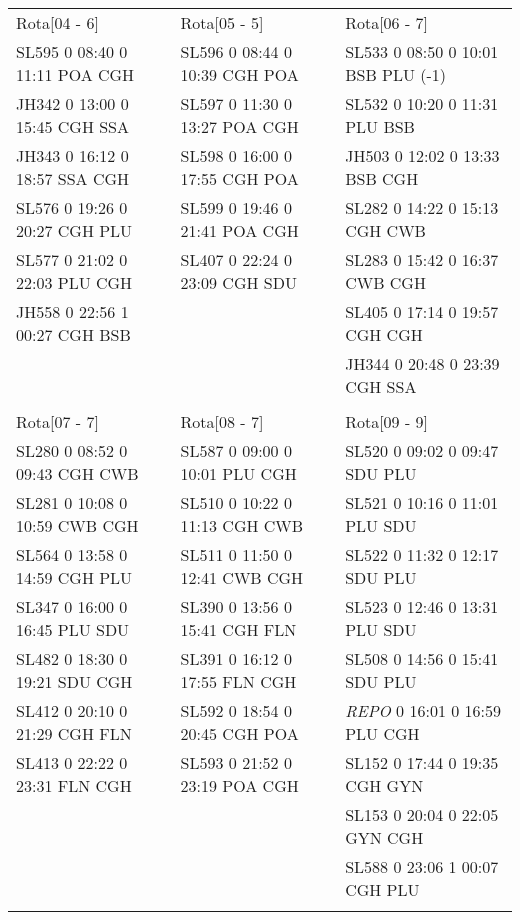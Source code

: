 \begin{scriptsize}
\begin{longtable}{l l l}
Rota[04 - 6]  & Rota[05 - 5]  & Rota[06 - 7] \\
SL595  0 08:40 0 11:11 POA CGH & SL596  0 08:44 0 10:39 CGH POA & SL533  0 08:50
0 10:01 BSB PLU (-1)\\
JH342  0 13:00 0 15:45 CGH SSA & SL597  0 11:30 0 13:27
POA CGH & SL532  0 10:20 0 11:31 PLU BSB\\ JH343  0 16:12 0 18:57 SSA CGH & SL598  0 16:00 0 17:55 CGH POA & JH503  0 12:02 0 13:33 BSB CGH\\
SL576  0 19:26 0 20:27 CGH PLU & SL599  0 19:46 0 21:41 POA CGH & SL282  0 14:22 0 15:13 CGH CWB\\
SL577  0 21:02 0 22:03 PLU CGH & SL407  0 22:24 0 23:09 CGH SDU & SL283  0 15:42 0 16:37 CWB CGH\\
JH558  0 22:56 1 00:27 CGH BSB & & SL405  0 17:14 0 19:57 CGH CGH\\
 &  & JH344  0 20:48 0 23:39 CGH SSA\\
 
\\

Rota[07 - 7]  & Rota[08 - 7]  & Rota[09 - 9] \\
SL280  0 08:52 0 09:43 CGH CWB & SL587  0 09:00 0 10:01 PLU CGH & SL520  0 09:02 0 09:47 SDU PLU\\
SL281  0 10:08 0 10:59 CWB CGH & SL510  0 10:22 0 11:13 CGH CWB & SL521  0 10:16 0 11:01 PLU SDU\\
SL564  0 13:58 0 14:59 CGH PLU & SL511  0 11:50 0 12:41 CWB CGH & SL522  0 11:32 0 12:17 SDU PLU\\
SL347  0 16:00 0 16:45 PLU SDU & SL390  0 13:56 0 15:41 CGH FLN & SL523  0 12:46 0 13:31 PLU SDU\\
SL482  0 18:30 0 19:21 SDU CGH & SL391  0 16:12 0 17:55 FLN CGH & SL508  0 14:56 0 15:41 SDU PLU\\
SL412  0 20:10 0 21:29 CGH FLN & SL592  0 18:54 0 20:45 CGH POA & \textit{REPO}  
0 16:01 0 16:59 PLU CGH\\ 
SL413  0 22:22 0 23:31 FLN CGH & SL593  0 21:52 0 23:19 POA CGH & SL152  0 17:44 0 19:35 CGH GYN\\
 &  & SL153  0 20:04 0 22:05 GYN CGH\\
 &  & SL588  0 23:06 1 00:07 CGH PLU\\

\\


\end{longtable}
\end{scriptsize}
